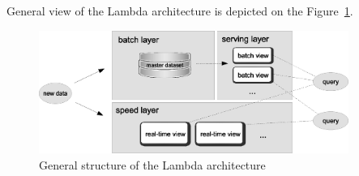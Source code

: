 
General view of the Lambda architecture is depicted on the
Figure~\ref{fig:lambda_architecture}.

\begin{figure}[H]
  \centering
  \includegraphics [width=0.9\textwidth]{images/LambdaArchitecture}
  \caption{General structure of the Lambda architecture}
  \label{fig:lambda_architecture}
\end{figure}






